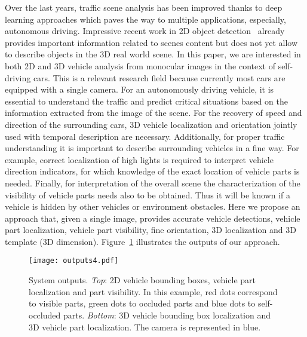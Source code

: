 \documentclass[10pt,twocolumn,letterpaper]{article}
\begin{document}
Over the last years, traffic scene analysis has been improved thanks to deep learning approaches which paves the way to multiple applications, especially, autonomous driving. Impressive recent work in 2D object detection~\cite{faster,rcnn,fast} already provides important information related to scenes content but does not yet allow to describe objects in the 3D real world scene. In this paper, we are interested in both 2D and 3D vehicle analysis from monocular images in the context of self-driving cars. This is a relevant research field because currently most cars are equipped with a single camera. For an autonomously driving vehicle, it is essential to understand the traffic and predict critical situations based on the information extracted from the image of the scene. For the recovery of speed and direction of the surrounding cars, 3D vehicle localization and orientation jointly used with temporal description are necessary. Additionally, for proper traffic understanding it is important to describe surrounding vehicles in a fine way. For example, correct localization of high lights is required to interpret vehicle direction indicators, for which knowledge of the exact location of vehicle parts is needed. Finally, for interpretation of the overall scene the characterization of the visibility of vehicle parts needs also to be obtained. Thus it will be known  if a vehicle is hidden by other vehicles or environment obstacles. Here we propose an approach that, given a single image, provides accurate vehicle detections, vehicle part localization, vehicle part visibility, fine orientation, 3D localization and 3D template (3D dimension). Figure~\ref{fig:outputs} illustrates the outputs of our approach. 

\begin{figure}[t]
\texttt{[image: outputs4.pdf]}
\vspace*{-5mm}
\centering
\caption{System outputs. \textit{Top}: 2D vehicle bounding boxes, vehicle part localization and part visibility. In this example, red dots correspond to visible parts, green dots to occluded parts and blue dots to self-occluded parts. \textit{Bottom}: 3D vehicle bounding box localization and 3D vehicle part localization. The camera is represented in blue.}
\vspace{-3mm}

\label{fig:outputs}
\end{figure}
\end{document}
